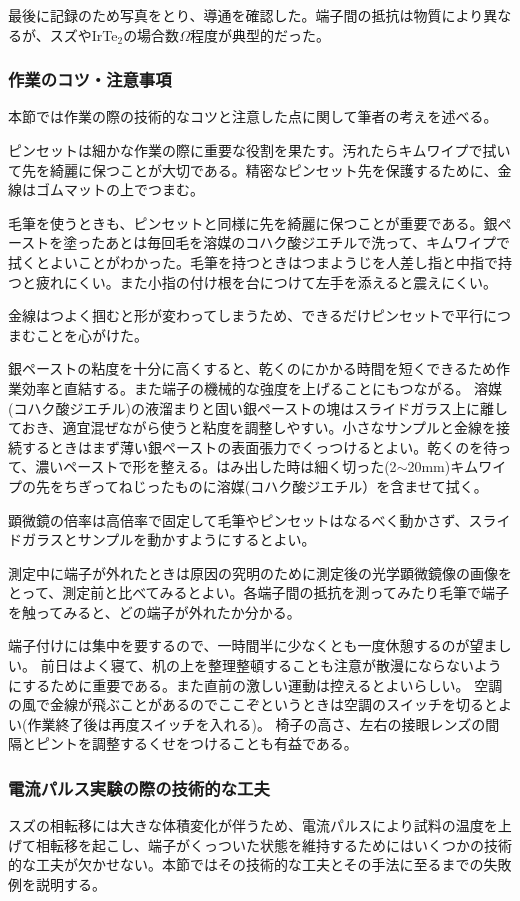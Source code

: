 最後に記録のため写真をとり、導通を確認した。端子間の抵抗は物質により異なるが、スズやIrTe$_2$の場合数$\Omega$程度が典型的だった。
 
\subsubsection{作業のコツ・注意事項} 
本節では作業の際の技術的なコツと注意した点に関して筆者の考えを述べる。

ピンセットは細かな作業の際に重要な役割を果たす。汚れたらキムワイプで拭いて先を綺麗に保つことが大切である。精密なピンセット先を保護するために、金線はゴムマットの上でつまむ。
 
毛筆を使うときも、ピンセットと同様に先を綺麗に保つことが重要である。銀ペーストを塗ったあとは毎回毛を溶媒のコハク酸ジエチルで洗って、キムワイプで拭くとよいことがわかった。毛筆を持つときはつまようじを人差し指と中指で持つと疲れにくい。また小指の付け根を台につけて左手を添えると震えにくい。

金線はつよく掴むと形が変わってしまうため、できるだけピンセットで平行につまむことを心がけた。

銀ペーストの粘度を十分に高くすると、乾くのにかかる時間を短くできるため作業効率と直結する。また端子の機械的な強度を上げることにもつながる。
溶媒(コハク酸ジエチル)の液溜まりと固い銀ペーストの塊はスライドガラス上に離しておき、適宜混ぜながら使うと粘度を調整しやすい。小さなサンプルと金線を接続するときはまず薄い銀ペーストの表面張力でくっつけるとよい。乾くのを待って、濃いペーストで形を整える。はみ出した時は細く切った(2$\sim$20mm)キムワイプの先をちぎってねじったものに溶媒(コハク酸ジエチル）を含ませて拭く。

顕微鏡の倍率は高倍率で固定して毛筆やピンセットはなるべく動かさず、スライドガラスとサンプルを動かすようにするとよい。

測定中に端子が外れたときは原因の究明のために測定後の光学顕微鏡像の画像をとって、測定前と比べてみるとよい。各端子間の抵抗を測ってみたり毛筆で端子を触ってみると、どの端子が外れたか分かる。

端子付けには集中を要するので、一時間半に少なくとも一度休憩するのが望ましい。
前日はよく寝て、机の上を整理整頓することも注意が散漫にならないようにするために重要である。また直前の激しい運動は控えるとよいらしい。
空調の風で金線が飛ぶことがあるのでここぞというときは空調のスイッチを切るとよい(作業終了後は再度スイッチを入れる)。 椅子の高さ、左右の接眼レンズの間隔とピントを調整するくせをつけることも有益である。

\subsubsection{電流パルス実験の際の技術的な工夫} 
スズの相転移には大きな体積変化が伴うため、電流パルスにより試料の温度を上げて相転移を起こし、端子がくっついた状態を維持するためにはいくつかの技術的な工夫が欠かせない。本節ではその技術的な工夫とその手法に至るまでの失敗例を説明する。


